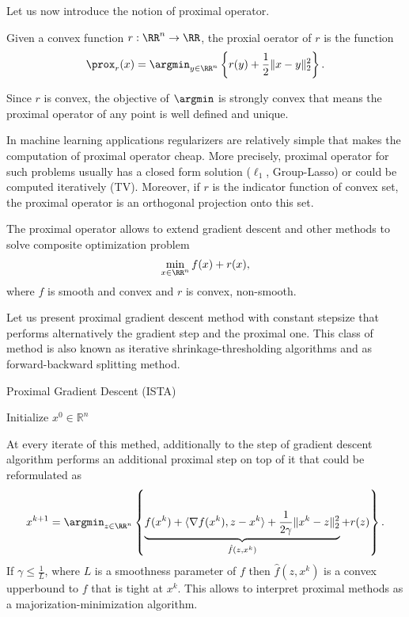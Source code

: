 Let us now introduce the notion of proximal operator.

\begin{definition}\label{def:proximal_operator}
Given a convex function $r:\RR^n\rightarrow \RR$, the proxial oerator of $r$ is the function
\begin{equation}
\prox_r(x) = \argmin_{y\in\RR^n}\left\{r(y) + \frac{1}{2}\|x-y\|_2^2\right\}.
\end{equation}
\end{definition}
Since $r$ is convex, the objective of $\argmin$ is strongly convex that means the proximal operator of any point is well defined and unique. 

In machine learning applications regularizers are relatively simple that makes the computation of proximal operator cheap. More precisely, proximal operator for such problems usually has a closed form solution ($\ell_1$, Group-Lasso) or could be computed iteratively (TV). Moreover, if $r$ is the indicator function of convex set, the proximal operator is an orthogonal projection onto this set. 


The proximal operator allows to extend gradient descent and other methods to solve composite optimization problem
\begin{equation}\label{eq:pb_composite}
\min_{x\in\RR^n} f(x) + r(x),
\end{equation}
where $f$ is smooth and convex and $r$ is convex, non-smooth.

Let us present proximal gradient descent method with constant stepsize that performs alternatively the gradient step and the proximal one. This class of method is also known as iterative shrinkage-thresholding algorithms and as forward-backward splitting method.

\begin{algorithm}
    \caption{Proximal Gradient Descent (ISTA)}
    \label{algo:pgd}
    \begin{algorithmic}
        \STATE Initialize $x^0\in\mathbb{R}^n$
        \ENDFOR
    \end{algorithmic}
\end{algorithm}

At every iterate of this methed, additionally to the step of gradient descent algorithm performs an additional proximal step on top of it that could be reformulated as
\begin{equation}\label{eq:step_pgd}
x^{k+1} = \argmin_{z\in\RR^n}\left\{\underbrace{f(x^k) + \langle\nabla f(x^k), z-x^k\rangle+\frac{1}{2\gamma}\|x^k-z\|_2^2}_{\hat{f}(z, x^k)} + r(z)\right\}.
\end{equation}
If $\gamma\leq \frac{1}{L}$, where $L$ is a smoothness parameter of $f$ then $\hat{f}(z, x^k)$ is a convex upperbound to $f$ that is tight at $x^k$. This allows to interpret proximal methods as a majorization-minimization algorithm.


